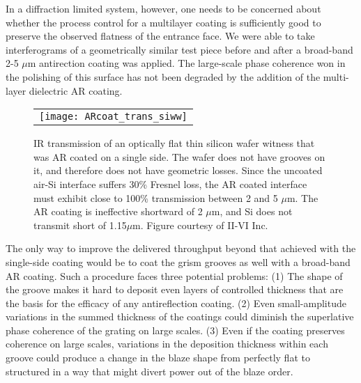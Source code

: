In a diffraction limited system, however,  one needs to be concerned about whether the process control for a multilayer coating is sufficiently good to preserve the observed flatness of the entrance face.  We were able to take interferograms of a geometrically similar test piece before and after a broad-band 2-5 $\mu$m antirection coating was applied.  The large-scale phase coherence won in the polishing of this surface has not been degraded by the addition of the multi-layer dielectric AR coating.
   
   \begin{figure}
   \begin{center}
   \begin{tabular}{c}
   \texttt{[image: ARcoat\_trans\_siww]}
   \end{tabular}
   \end{center}
   \caption[Transmission of single side AR coated silicon wafer witness] {\label{fig:im4}  IR transmission of an optically flat thin silicon wafer witness that was AR coated on a single side.  The wafer does not have grooves on it, and therefore does not have geometric losses.  Since the uncoated air-Si interface suffers 30\% Fresnel loss, the AR coated interface must exhibit close to 100\% transmission between 2 and 5 $\mu$m.  The AR coating is ineffective shortward of 2 $\mu$m, and Si does not transmit short of 1.15$\mu$m.  Figure courtesy of II-VI Inc.} 
   \end{figure} 
 
The only way to improve the delivered throughput beyond that achieved with the single-side coating would be to coat the grism grooves as well with a broad-band AR coating.  Such a procedure faces three potential problems:  (1) The shape of the groove makes it hard to deposit even layers of controlled thickness that are the basis for the efficacy of any antireflection coating. (2) Even small-amplitude variations in the summed thickness of the coatings could diminish the superlative phase coherence of the grating on large scales. (3) Even if the coating preserves coherence on large scales, variations in the deposition thickness within each groove could produce a change in the blaze shape from perfectly flat to structured in a way that might divert power out of the blaze order.

